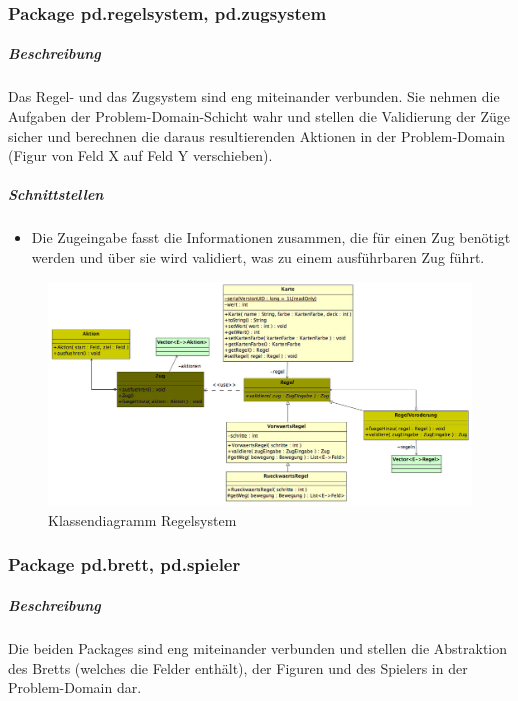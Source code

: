 \documentclass[12pt,halfparskip]{scrartcl}
\begin{document}

\clearpage
\subsubsection{Package pd.regelsystem, pd.zugsystem} %
\label{ssub:package_pd_regelsystem}
\subparagraph{Beschreibung}
Das Regel- und das Zugsystem sind eng miteinander verbunden. Sie nehmen die Aufgaben der Problem-Domain-Schicht wahr und stellen die Validierung der Züge sicher und berechnen die daraus resultierenden Aktionen in der Problem-Domain (Figur von Feld X auf Feld Y verschieben).

\subparagraph{Schnittstellen} %
\label{ssub:schnittstellen}
\begin{itemize}
	\item Die Zugeingabe fasst die Informationen zusammen, die für einen Zug benötigt werden und über sie wird validiert, was zu einem ausführbaren Zug führt.
\end{itemize}

\begin{figure}[h]
	\centering
	\includegraphics[width=\textwidth]{pd_regelsystem}
	\caption{Klassendiagramm Regelsystem}
	\label{fig:pd_regelsystem}
\end{figure}


\clearpage
\subsubsection{Package pd.brett, pd.spieler} %
\label{ssub:package_pd_brett}
\subparagraph{Beschreibung}
Die beiden Packages sind eng miteinander verbunden und stellen die Abstraktion des Bretts (welches die Felder enthält), der Figuren und des Spielers in der Problem-Domain dar.
\end{document}

